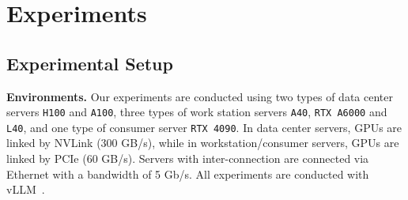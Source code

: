 \section{Experiments}
\label{sec:experiment}

\subsection{Experimental Setup}
\label{sec:exp_setup}

\textbf{Environments.} Our experiments are conducted using two types of data center servers \texttt{H100} and \texttt{A100}, three types of work station servers \texttt{A40}, \texttt{RTX A6000} and \texttt{L40}, and one type of consumer server \texttt{RTX 4090}. In data center servers, GPUs are linked by NVLink (300 GB/s), while in workstation/consumer servers, GPUs are linked by PCIe (60 GB/s). Servers with inter-connection are connected via Ethernet with a bandwidth of 5 Gb/s. All experiments are conducted with vLLM~\cite{kwon2023efficient}.



